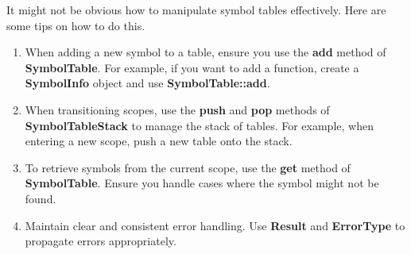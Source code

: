 \documentclass[
	12pt, %
]{fphw}
\begin{document}
\begin{problem}
    It might not be obvious how to manipulate symbol tables effectively. Here are some tips on how to do this.
    \\
    \begin{enumerate}
        \item When adding a new symbol to a table, ensure you use the \textbf{add} method of \textbf{SymbolTable}. For example, if you want to add a function, create a \textbf{SymbolInfo} object and use \textbf{SymbolTable::add}.
        \item When transitioning scopes, use the \textbf{push} and \textbf{pop} methods of \textbf{SymbolTableStack} to manage the stack of tables. For example, when entering a new scope, push a new table onto the stack.
        \item To retrieve symbols from the current scope, use the \textbf{get} method of \textbf{SymbolTable}. Ensure you handle cases where the symbol might not be found.
        \item Maintain clear and consistent error handling. Use \textbf{Result} and \textbf{ErrorType} to propagate errors appropriately.
    \end{enumerate}
\end{problem}

\pagebreak
\end{document}
